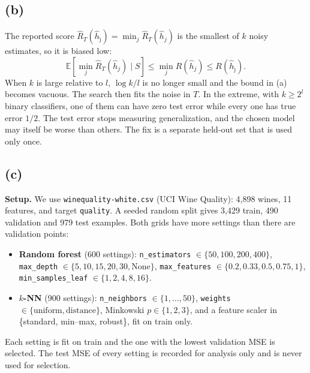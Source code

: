 \documentclass[11pt]{article}
\newcommand{\E}{\mathbb{E}}
\begin{document}
\subsection*{(b)}
The reported score $\hat R_T(\hat h_{\hat\jmath})=\min_j\hat R_T(\hat h_j)$ is the smallest of $k$ noisy
estimates, so it is biased low:
\[
\E[\min_j\hat R_T(\hat h_j)\mid S]\le\min_jR(\hat h_j)\le R(\hat h_{\hat\jmath}).
\]
When $k$ is large relative to $l$, $\log k/l$ is no longer small and the bound in (a) becomes vacuous.
The search then fits the noise in $T$. In the extreme, with $k\ge 2^l$ binary classifiers, one of
them can have zero test error while every one has true error $1/2$. The test error stops measuring
generalization, and the chosen model may itself be worse than others. The fix is a separate held-out
set that is used only once.

\subsection*{(c)}
\textbf{Setup.} We use \texttt{winequality-white.csv} (UCI Wine Quality): 4{,}898 wines, 11
features, and target \texttt{quality}. A seeded random split gives 3{,}429 train, 490 validation and 979
test examples. Both grids have more settings than there are validation points:
{\sloppy
\begin{itemize}[leftmargin=*,itemsep=1pt]
  \item \textbf{Random forest} (600 settings): \texttt{n\_estimators} $\in\{50,100,200,400\}$,
  \texttt{max\_depth} $\in\{5,10,15,20,30,\text{None}\}$, \texttt{max\_features} $\in\{0.2,0.33,0.5,0.75,1\}$,
  \texttt{min\_samples\_leaf} $\in\{1,2,4,8,16\}$.
  \item \textbf{$k$-NN} (900 settings): \texttt{n\_neighbors} $\in\{1,\dots,50\}$,
  \texttt{weights} $\in\{\text{uniform},\text{distance}\}$, Minkowski $p\in\{1,2,3\}$, and a feature scaler
  in \{standard, min--max, robust\}, fit on train only.
\end{itemize}}
Each setting is fit on train and the one with the lowest validation MSE is selected. The test MSE of every
setting is recorded for analysis only and is never used for selection.

\begin{table}[H]
\centering\small
\\[4pt]

\caption*{Selected model per class. ``Constant'' predicts the training mean.}
\end{table}
\end{document}
